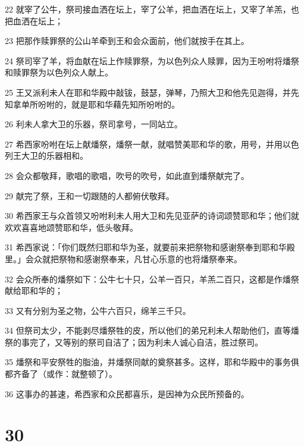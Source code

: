 \par 22 就宰了公牛，祭司接血洒在坛上，宰了公羊，把血洒在坛上，又宰了羊羔，也把血洒在坛上；
\par 23 把那作赎罪祭的公山羊牵到王和会众面前，他们就按手在其上。
\par 24 祭司宰了羊，将血献在坛上作赎罪祭，为以色列众人赎罪，因为王吩咐将燔祭和赎罪祭为以色列众人献上。
\par 25 王又派利未人在耶和华殿中敲钹，鼓瑟，弹琴，乃照大卫和他先见迦得，并先知拿单所吩咐的，就是耶和华藉先知所吩咐的。
\par 26 利未人拿大卫的乐器，祭司拿号，一同站立。
\par 27 希西家吩咐在坛上献燔祭，燔祭一献，就唱赞美耶和华的歌，用号，并用以色列王大卫的乐器相和。
\par 28 会众都敬拜，歌唱的歌唱，吹号的吹号，如此直到燔祭献完了。
\par 29 献完了祭，王和一切跟随的人都俯伏敬拜。
\par 30 希西家王与众首领又吩咐利未人用大卫和先见亚萨的诗词颂赞耶和华；他们就欢欢喜喜地颂赞耶和华，低头敬拜。
\par 31 希西家说：「你们既然归耶和华为圣，就要前来把祭物和感谢祭奉到耶和华殿里。」会众就把祭物和感谢祭奉来，凡甘心乐意的也将燔祭奉来。
\par 32 会众所奉的燔祭如下：公牛七十只，公羊一百只，羊羔二百只，这都是作燔祭献给耶和华的；
\par 33 又有分别为圣之物，公牛六百只，绵羊三千只。
\par 34 但祭司太少，不能剥尽燔祭牲的皮，所以他们的弟兄利未人帮助他们，直等燔祭的事完了，又等别的祭司自洁了；因为利未人诚心自洁，胜过祭司。
\par 35 燔祭和平安祭牲的脂油，并燔祭同献的奠祭甚多。这样，耶和华殿中的事务俱都齐备了（或作：就整顿了）。
\par 36 这事办的甚速，希西家和众民都喜乐，是因神为众民所预备的。

\chapter{30}

